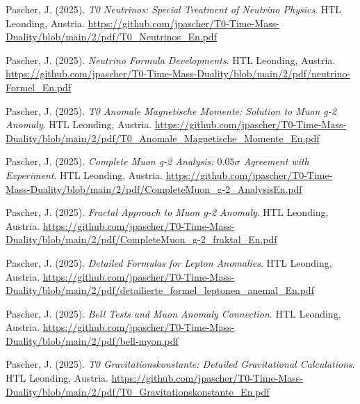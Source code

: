 \documentclass{article}
\begin{document}
\begin{thebibliography}{99}
		
		Pascher, J. (2025).
		\textit{T0 Neutrinos: Special Treatment of Neutrino Physics}.
		HTL Leonding, Austria.
		\url{https://github.com/jpascher/T0-Time-Mass-Duality/blob/main/2/pdf/T0_Neutrinos_En.pdf}
		
		Pascher, J. (2025).
		\textit{Neutrino Formula Developments}.
		HTL Leonding, Austria.
		\url{https://github.com/jpascher/T0-Time-Mass-Duality/blob/main/2/pdf/neutrino-Formel_En.pdf}
		
		
		Pascher, J. (2025).
		\textit{T0 Anomale Magnetische Momente: Solution to Muon g-2 Anomaly}.
		HTL Leonding, Austria.
		\url{https://github.com/jpascher/T0-Time-Mass-Duality/blob/main/2/pdf/T0_Anomale_Magnetische_Momente_En.pdf}
		
		Pascher, J. (2025).
		\textit{Complete Muon g-2 Analysis: $0.05\sigma$ Agreement with Experiment}.
		HTL Leonding, Austria.
		\url{https://github.com/jpascher/T0-Time-Mass-Duality/blob/main/2/pdf/CompleteMuon_g-2_AnalysisEn.pdf}
		
		Pascher, J. (2025).
		\textit{Fractal Approach to Muon g-2 Anomaly}.
		HTL Leonding, Austria.
		\url{https://github.com/jpascher/T0-Time-Mass-Duality/blob/main/2/pdf/CompleteMuon_g-2_fraktal_En.pdf}
		
		Pascher, J. (2025).
		\textit{Detailed Formulas for Lepton Anomalies}.
		HTL Leonding, Austria.
		\url{https://github.com/jpascher/T0-Time-Mass-Duality/blob/main/2/pdf/detailierte_formel_leptonen_anemal_En.pdf}
		
		Pascher, J. (2025).
		\textit{Bell Tests and Muon Anomaly Connection}.
		HTL Leonding, Austria.
		\url{https://github.com/jpascher/T0-Time-Mass-Duality/blob/main/2/pdf/bell-myon.pdf}
		
		
		Pascher, J. (2025).
		\textit{T0 Gravitationskonstante: Detailed Gravitational Calculations}.
		HTL Leonding, Austria.
		\url{https://github.com/jpascher/T0-Time-Mass-Duality/blob/main/2/pdf/T0_Gravitationskonstante_En.pdf}
		

\end{thebibliography}
\end{document}
